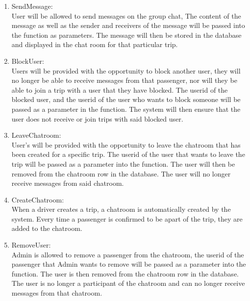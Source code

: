\documentclass[hidelinks, 12pt, a4paper]{article}
\begin{document}
\begin{enumerate}[label=U1.\arabic*]

      \item SendMessage:\\
            User will be allowed to send messages on the group chat, The content of the message as well as the sender and receivers of the message will be passed into the function as parameters. The message will  then be stored in the database and displayed in the chat room for that particular trip.\\


      \item BlockUser:\\
            Users will be provided with the opportunity to block another user, they will no longer be able to receive messages from that passenger, nor will they be able to join a trip with a user that they have blocked. The userid of the blocked user, and the userid of the user who wants to block someone will be passed as a parameter in the function. The system will then ensure that the user does not receive or join trips with said blocked user.\\

      \item LeaveChatroom:\\
            User’s will be provided with the opportunity to leave the chatroom that has been created for a specific trip. The userid of the user that wants to leave the trip will be passed as a parameter into the function. The user will then be removed from the chatroom row in the database. The user will no longer receive messages from said chatroom.\\

      \item CreateChatroom: \\
            When a driver creates a trip, a chatroom is automatically created by the system. Every time a passenger is confirmed to be apart of the trip, they are added to the chatroom.\\

      \item RemoveUser:\\
            Admin is allowed to remove a passenger from the chatroom, the userid of the passenger that Admin wants to remove will be passed as a parameter into the function. The user is then removed from the chatroom row in the database. The user is no longer a participant of the chatroom and can no longer receive messages from that chatroom.\\


\end{enumerate}
\end{document}
